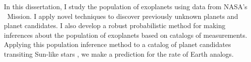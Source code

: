 In this dissertation, I study the population of exoplanets using data from
NASA's \kepler\ Mission.
I apply novel techniques to discover previously unknown planets and planet
candidates.
I also develop a robust probabilistic method for making inferences about the
population of exoplanets based on catalogs of measurements.
Applying this population inference method to a catalog of planet candidates
transiting Sun-like stars \citep{Petigura:2013}, we make a prediction for the
rate of Earth analogs.
